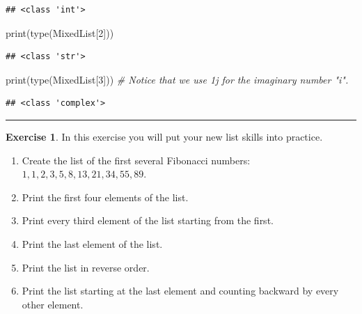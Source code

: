 \documentclass[
]{book}
\newenvironment{Shaded}{\begin{snugshade}}{\end{snugshade}}
\newcommand{\BuiltInTok}[1]{#1}
\newcommand{\CommentTok}[1]{\textcolor[rgb]{0.56,0.35,0.01}{\textit{#1}}}
\newcommand{\DecValTok}[1]{\textcolor[rgb]{0.00,0.00,0.81}{#1}}
\newcommand{\NormalTok}[1]{#1}
\providecommand{\tightlist}{%
  \setlength{\itemsep}{0pt}\setlength{\parskip}{0pt}}
\theoremstyle{definition}
\theoremstyle{definition}
\theoremstyle{definition}
\newtheorem{exercise}{Exercise}[chapter]
\theoremstyle{remark}
\begin{document}
\begin{verbatim}
## <class 'int'>
\end{verbatim}

\begin{Shaded}
\begin{Highlighting}[]
\BuiltInTok{print}\NormalTok{(}\BuiltInTok{type}\NormalTok{(MixedList[}\DecValTok{2}\NormalTok{]))}
\end{Highlighting}
\end{Shaded}

\begin{verbatim}
## <class 'str'>
\end{verbatim}

\begin{Shaded}
\begin{Highlighting}[]
\BuiltInTok{print}\NormalTok{(}\BuiltInTok{type}\NormalTok{(MixedList[}\DecValTok{3}\NormalTok{])) }\CommentTok{\# Notice that we use 1j for the imaginary number "i".}
\end{Highlighting}
\end{Shaded}

\begin{verbatim}
## <class 'complex'>
\end{verbatim}

\begin{center}\rule{0.5\linewidth}{0.5pt}\end{center}

\begin{exercise}
\protect\hypertarget{exr:unnamed-chunk-644}{}{\label{exr:unnamed-chunk-644} }In this exercise you will put your new list skills into practice.

\begin{enumerate}
\def\labelenumi{\alph{enumi}.}
\tightlist
\item
  Create the list of the first several Fibonacci numbers: \(1, 1, 2, 3, 5, 8, 13, 21, 34, 55, 89\).
\item
  Print the first four elements of the list.
\item
  Print every third element of the list starting from the first.
\item
  Print the last element of the list.
\item
  Print the list in reverse order.
\item
  Print the list starting at the last element and counting backward by every other element.
\end{enumerate}
\end{exercise}
\end{document}
